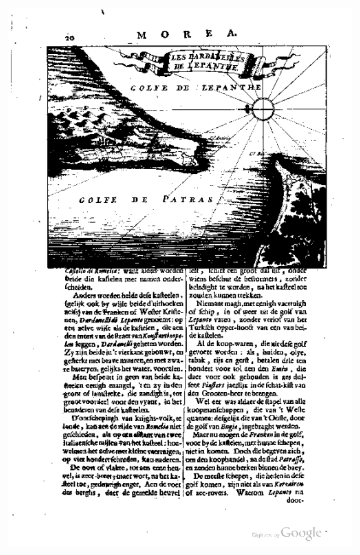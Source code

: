 \begin{figure}
\centering
    \begin{subfigure}[b]{0.4\textwidth}
\includegraphics[width=\textwidth]{resources/pageImageExample}
    \end{subfigure}
    \begin{subfigure}[b]{0.4\textwidth}

\end{subfigure}
\end{figure}
